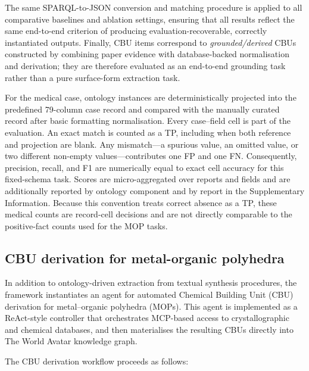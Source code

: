 The same SPARQL-to-JSON conversion and matching procedure is applied to all
comparative baselines and ablation settings, ensuring that all results reflect
the same end-to-end criterion of producing evaluation-recoverable, correctly
instantiated outputs. Finally, CBU items correspond to \emph{grounded/derived}
CBUs constructed by combining paper evidence with database-backed normalisation
and derivation; they are therefore evaluated as an end-to-end grounding task
rather than a pure surface-form extraction task.

For the medical case, ontology instances are deterministically projected into the predefined 79-column case record and compared with the manually curated record after basic formatting normalisation. Every case--field cell is part of the evaluation. An exact match is counted as a TP, including when both reference and projection are blank. Any mismatch---a spurious value, an omitted value, or two different non-empty values---contributes one FP and one FN. Consequently, precision, recall, and F1 are numerically equal to exact cell accuracy for this fixed-schema task. Scores are micro-aggregated over reports and fields and are additionally reported by ontology component and by report in the Supplementary Information. Because this convention treats correct absence as a TP, these medical counts are record-cell decisions and are not directly comparable to the positive-fact counts used for the MOP tasks.



\subsection{CBU derivation for metal-organic polyhedra}

In addition to ontology-driven extraction from textual synthesis procedures, the framework instantiates an agent for automated Chemical Building Unit (CBU) derivation for metal--organic polyhedra (MOPs). This agent is implemented as a ReAct-style controller that orchestrates MCP-based access to crystallographic and chemical databases, and then materialises the resulting CBUs directly into The World Avatar knowledge graph.

The CBU derivation workflow proceeds as follows:

